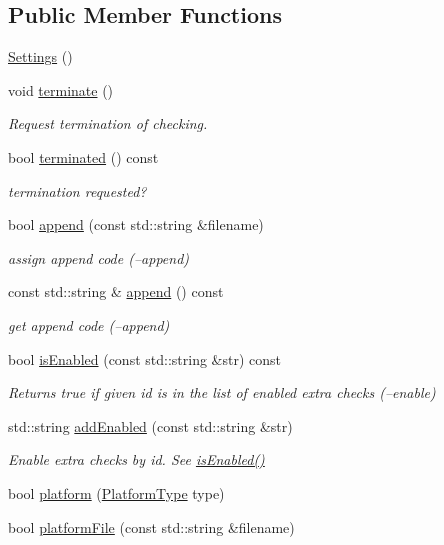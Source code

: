 \subsection*{Public Member Functions}
\begin{DoxyCompactItemize}
\item 
\hyperlink{class_settings_ab7169a6eefce79566dd07db3b1e5e967}{Settings} ()
\item 
void \hyperlink{class_settings_a2384cf7e32819e9da61dbbbda6853c11}{terminate} ()
\begin{DoxyCompactList}\small\item\em Request termination of checking. \end{DoxyCompactList}\item 
bool \hyperlink{class_settings_a9317ff8b48c95b8b25d660883f5afeb0}{terminated} () const 
\begin{DoxyCompactList}\small\item\em termination requested? \end{DoxyCompactList}\item 
bool \hyperlink{class_settings_a9379218e01e7e4477527f4e72538e9db}{append} (const std\-::string \&filename)
\begin{DoxyCompactList}\small\item\em assign append code (--append) \end{DoxyCompactList}\item 
const std\-::string \& \hyperlink{class_settings_ac3b6d64fe56c70b69b03a2b8c066effa}{append} () const 
\begin{DoxyCompactList}\small\item\em get append code (--append) \end{DoxyCompactList}\item 
bool \hyperlink{class_settings_a1b33748bfffa16acc01bd9687bb2755a}{is\-Enabled} (const std\-::string \&str) const 
\begin{DoxyCompactList}\small\item\em Returns true if given id is in the list of enabled extra checks (--enable) \end{DoxyCompactList}\item 
std\-::string \hyperlink{class_settings_a24c9995edb6f1aaca2ffe76ac6d29edb}{add\-Enabled} (const std\-::string \&str)
\begin{DoxyCompactList}\small\item\em Enable extra checks by id. See \hyperlink{class_settings_a1b33748bfffa16acc01bd9687bb2755a}{is\-Enabled()} \end{DoxyCompactList}\item 
bool \hyperlink{class_settings_a6da762b74e7e8b8104849a1d8feaafec}{platform} (\hyperlink{class_settings_a7c94920f2160a5cf261ce822a0ce2ee8}{Platform\-Type} type)
\item 
bool \hyperlink{class_settings_ae96281d10c45bb31246f025e4fbde6c6}{platform\-File} (const std\-::string \&filename)
\end{DoxyCompactItemize}
